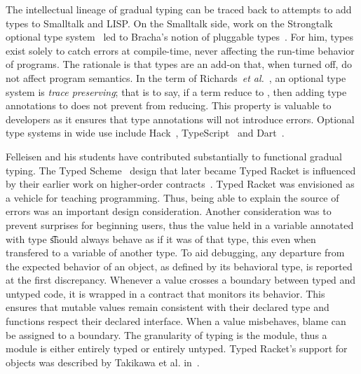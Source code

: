 \documentclass[USenglish]{tex/lipics-v2016}
\begin{document}
\vspace{-10mm}
\noindent The intellectual lineage of gradual typing can be traced back to
attempts to add types to Smalltalk and LISP. On the Smalltalk side, work on
the Strongtalk optional type system~\cite{Bracha93} led to Bracha's notion
of pluggable types~\cite{pluggabletypes}. For him, types exist solely to
catch errors at compile-time, never affecting the run-time behavior of
programs. The rationale is that types are an add-on that, when turned off,
do not affect program semantics.  In the term of Richards~\emph{et
  al.}~\cite{ecoop15}, an optional type system is \emph{trace preserving};
that is to say, if a term \e reduce to \a, then adding type annotations to
\e does not prevent \e from reducing.  This property is valuable to
developers as it ensures that type annotations will not introduce errors.
Optional type systems in wide use include Hack~\cite{hack13},
TypeScript~\cite{BAT14} and Dart~\cite{dart13}.

Felleisen and his students have contributed substantially to functional
gradual typing. The Typed Scheme~\cite{tf-popl08} design that later became
Typed Racket is influenced by their earlier work on higher-order
contracts~\cite{ff-icfp02}. Typed Racket was envisioned as a vehicle for
teaching programming. Thus, being able to explain the source of errors was
an important design consideration. Another consideration was to prevent
surprises for beginning users, thus the value held in a variable annotated
with type \t should always behave as if it was of that type, this even when
transfered to a variable of another type. To aid debugging, any departure
from the expected behavior of an object, as defined by its behavioral type,
is reported at the first discrepancy.  Whenever a value crosses a boundary
between typed and untyped code, it is wrapped in a contract that monitors
its behavior. This ensures that mutable values remain consistent with their
declared type and functions respect their declared interface. When a value
misbehaves, blame can be assigned to a boundary. The granularity of typing
is the module, thus a module is either entirely typed or entirely untyped.
Typed Racket's support for objects was described by Takikawa et
al. in~\cite{Takikawa:2012}.
\end{document}
